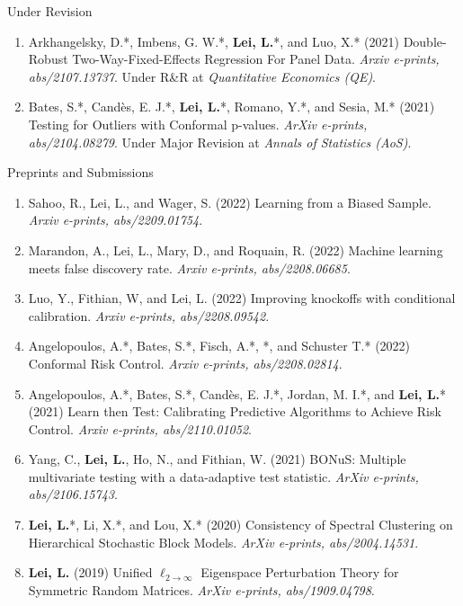 \documentclass{article}
\begin{document}
\begin{large}
\noindent Under Revision
\end{large}

\begin{enumerate}
\item Arkhangelsky, D.*, Imbens, G. W.*, \textbf{Lei, L.}*, and Luo, X.* (2021) Double-Robust Two-Way-Fixed-Effects Regression For Panel Data. \emph{Arxiv e-prints, abs/2107.13737}. Under R\&R at \emph{Quantitative Economics (QE)}.
\item Bates, S.*, Cand\`{e}s, E. J.*, \textbf{Lei, L.}*, Romano, Y.*, and Sesia, M.* (2021) Testing for Outliers with Conformal p-values. \emph{ArXiv e-prints, abs/2104.08279}. Under Major Revision at \emph{Annals of Statistics (AoS)}.
\end{enumerate}

\begin{large}
\noindent Preprints and Submissions
\end{large}

\begin{enumerate}
\item Sahoo, R., Lei, L., and Wager, S. (2022) Learning from a Biased Sample. \emph{Arxiv e-prints, abs/2209.01754}.
\item Marandon, A., Lei, L., Mary, D., and Roquain, R. (2022) Machine learning meets false discovery rate. \emph{Arxiv e-prints, abs/2208.06685}.
\item Luo, Y., Fithian, W, and Lei, L. (2022) Improving knockoffs with conditional calibration. \emph{Arxiv e-prints, abs/2208.09542}.
\item Angelopoulos, A.*, Bates, S.*, Fisch, A.*, *, and Schuster T.* (2022) Conformal Risk Control. \emph{Arxiv e-prints, abs/2208.02814}.
\item Angelopoulos, A.*, Bates, S.*, Cand\`{e}s, E. J.*, Jordan, M. I.*, and \textbf{Lei, L.}* (2021) Learn then Test: Calibrating Predictive Algorithms to Achieve Risk Control. \emph{Arxiv e-prints, abs/2110.01052}.
\item Yang, C., \textbf{Lei, L.}, Ho, N., and Fithian, W. (2021) BONuS: Multiple multivariate testing with a data-adaptive test statistic. \emph{ArXiv e-prints, abs/2106.15743}.
\item \textbf{Lei, L.}*, Li, X.*, and Lou, X.* (2020) Consistency of Spectral Clustering on Hierarchical Stochastic Block Models. \emph{ArXiv e-prints, abs/2004.14531}.
\item \textbf{Lei, L.} (2019) Unified $\ell_{2\rightarrow\infty}$ Eigenspace Perturbation Theory for Symmetric Random Matrices. \emph{ArXiv e-prints, abs/1909.04798}.
\end{enumerate}
\end{document}
